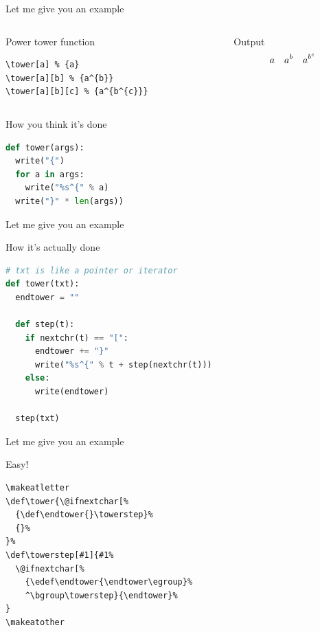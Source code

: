 \documentclass[xetex, onlymath, handout]{beamer}
\begin{document}
\begin{frame}[fragile]{Let me give you an example}
  \begin{columns}
    \begin{column}{.6\linewidth}
      \begin{block}{Power tower function}
        \begin{lstlisting}
\tower[a] % {a}
\tower[a][b] % {a^{b}}
\tower[a][b][c] % {a^{b^{c}}}
        \end{lstlisting}
      \end{block}
    \end{column}
    \begin{column}{.4\linewidth}
      \begin{exampleblock}{Output}
        \Large
        \[
          \tower[a] \quad
          \tower[a][b] \quad
          \tower[a][b][c]
        \]
      \end{exampleblock}
    \end{column}
  \end{columns}
  \begin{block}{How you think it's done}
    \begin{lstlisting}[language=python]
def tower(args):
  write("{")
  for a in args:
    write("%s^{" % a)
  write("}" * len(args))
    \end{lstlisting}
  \end{block}
\end{frame}

\begin{frame}[fragile]{Let me give you an example}
  \begin{block}{How it's actually done}
    \begin{lstlisting}[language=python]
# txt is like a pointer or iterator
def tower(txt):
  endtower = ""

  def step(t):
    if nextchr(t) == "[":
      endtower += "}"
      write("%s^{" % t + step(nextchr(t)))
    else:
      write(endtower)

  step(txt)
    \end{lstlisting}
  \end{block}
\end{frame}

\begin{frame}[fragile]{Let me give you an example}
  \begin{block}{Easy!}
    \begin{lstlisting}
\makeatletter
\def\tower{\@ifnextchar[%
  {\def\endtower{}\towerstep}%
  {}%
}%
\def\towerstep[#1]{#1%
  \@ifnextchar[%
    {\edef\endtower{\endtower\egroup}%
    ^\bgroup\towerstep}{\endtower}%
}
\makeatother
    \end{lstlisting}
  \end{block}
\end{frame}
\end{document}

